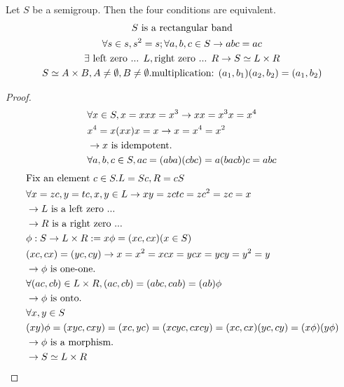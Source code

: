 \begin{Them}
    Let $S$ be a semigroup. Then the four conditions are equivalent.
    \begin{gather*}
        S \text{\space is a rectangular band}   \\
        \forall s \in s, s^2=s; \forall a,b,c \in S \rightarrow abc=ac  \\
        \exists \text{\space left zero ... } L,\text{right zero ... }R\rightarrow S \simeq L \times R   \\
        S\simeq A\times B, A\neq \emptyset,B\neq \emptyset. \text{multiplication: } (a_1,b_1)(a_2,b_2)=(a_1,b_2)
    \end{gather*}

    \begin{proof}
        \begin{align*}
            &\forall x \in S, x=xxx=x^3\rightarrow xx=x^3x=x^4   \\
            &x^4=x(xx)x=x \rightarrow x=x^4=x^2 \\
            &\rightarrow x \text{\space is idempotent.} \\
            &\forall a,b,c \in S,ac=(aba)(cbc)=a(bacb)c=abc
        \end{align*}
        \begin{align*}
            &\text{Fix an element } c\in S. L=Sc, R=cS\\
            &\forall x=zc,y=tc, x,y\in L \rightarrow xy=zctc=zc^2=zc=x  \\
            &\rightarrow L \text{\space is a left zero ...} \\
            &\rightarrow R \text{\space is a right zero ...}    \\
            &\phi:S\rightarrow L\times R:=x\phi=(xc, cx)(x\in S)    \\
            &(xc,cx)=(yc,cy) \rightarrow x=x^2=xcx=ycx=ycy=y^2=y    \\
            &\rightarrow \phi \text{\space is one-one.}    \\
            &\forall (ac,cb)\in L\times R, (ac,cb)=(abc,cab)=(ab)\phi   \\
            &\rightarrow \phi \text{\space is onto.}    \\
            &\forall x,y \in S  \\
            &(xy)\phi=(xyc,cxy)=(xc,yc)=(xcyc,cxcy)=(xc,cx)(yc,cy)=(x\phi)(y\phi)   \\
            &\rightarrow \phi \text{\space is a morphism.}  \\
            &\rightarrow S\simeq L\times R
        \end{align*}


\end{proof}
\end{Them}
